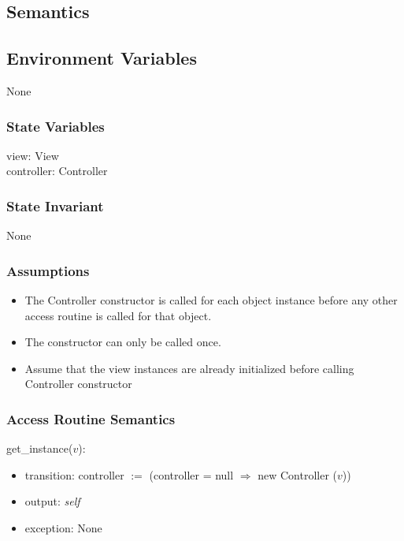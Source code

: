\documentclass[12pt]{article}
\begin{document}
\subsection* {Semantics}

\subsection*{Environment Variables}

None

\subsubsection* {State Variables}

view: View \\
controller: Controller

\subsubsection* {State Invariant}

None

\subsubsection* {Assumptions}

\begin{itemize}
  \item The Controller constructor is called for each object instance before any
  other access routine is called for that object.  
  \item The constructor can only be called once.
  \item Assume that the view instances are already initialized before calling 
  Controller constructor
\end{itemize}

\subsubsection* {Access Routine Semantics}

get\_instance($v$):
\begin{itemize}
  \item transition: controller $:=$ (controller = null $\Rightarrow$ new Controller ($v$))
  \item output: \textit{self}
  \item exception: None
\end{itemize}
\end{document}
